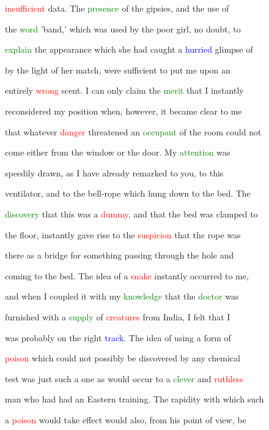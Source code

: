 \textcolor{red}{insufficient} data. The \textcolor{green}{presence} of the gipsies, and the use of

 the \textcolor{green}{word} 'band,' which was used by the poor girl, no \textcolor{BurntOrange}{doubt,} to

 \textcolor{green}{explain} the appearance which she had caught a \textcolor{blue}{hurried} glimpse of

 by the light of her match, were sufficient to put me upon an

 entirely \textcolor{red}{wrong} scent. I can only claim the \textcolor{green}{merit} that I instantly

 reconsidered my position when, however, it became clear to me

 that whatever \textcolor{red}{danger} \textcolor{BurntOrange}{threatened} an \textcolor{green}{occupant} of the room could not

 come either from the window or the door. My \textcolor{green}{attention} was

 speedily drawn, as I have already remarked to you, to this

 ventilator, and to the bell-rope which hung down to the bed. The

 \textcolor{green}{discovery} that this was a \textcolor{red}{dummy,} and that the bed was clamped to

 the floor, instantly gave rise to the \textcolor{red}{suspicion} that the rope was

 there as a bridge for something passing through the hole and

 coming to the bed. The idea of a \textcolor{red}{snake} instantly occurred to me,

 and when I coupled it with my \textcolor{green}{knowledge} that the \textcolor{green}{doctor} was

 furnished with a \textcolor{green}{supply} of \textcolor{red}{creatures} from India, I felt that I

 was probably on the right \textcolor{blue}{track.} The idea of using a form of

 \textcolor{red}{poison} which could not possibly be discovered by any chemical

 test was just such a one as would occur to a \textcolor{green}{clever} and \textcolor{red}{ruthless}

 man who had had an Eastern training. The rapidity with which such

 a \textcolor{red}{poison} would take effect would also, from his point of view, be

